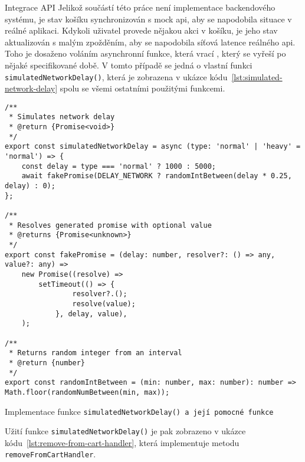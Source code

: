 \begin{subsection}{Integrace API}
    \label{subsec:implementace-kosik-api}
    Jelikož součástí této práce není implementace backendového systému, je stav košíku synchronizován s mock \ac{api}, aby se napodobila situace v reálné aplikaci.
    Kdykoli uživatel provede nějakou akci v košíku, je jeho stav aktualizován s malým zpožděním, aby se napodobila síťová latence reálného \ac{api}.
    Toho je dosaženo voláním asynchronní funkce, která vrací , který se vyřeší po nějaké specifikované době.
    V tomto případě se jedná o vlastní funkci \texttt{simulatedNetworkDelay()}, která je zobrazena v ukázce kódu~\ref{lst:simulated-network-delay} spolu se všemi ostatními použitými funkcemi.

    \begin{listing}[H]
        \begin{verbatim}
/**
 * Simulates network delay
 * @return {Promise<void>}
 */
export const simulatedNetworkDelay = async (type: 'normal' | 'heavy' = 'normal') => {
	const delay = type === 'normal' ? 1000 : 5000;
	await fakePromise(DELAY_NETWORK ? randomIntBetween(delay * 0.25, delay) : 0);
};

/**
 * Resolves generated promise with optional value
 * @returns {Promise<unknown>}
 */
export const fakePromise = (delay: number, resolver?: () => any, value?: any) =>
	new Promise((resolve) =>
		setTimeout(() => {
				resolver?.();
				resolve(value);
			}, delay, value),
	);

/**
 * Returns random integer from an interval
 * @return {number}
 */
export const randomIntBetween = (min: number, max: number): number => Math.floor(randomNumBetween(min, max));
        \end{verbatim}
        \caption{Implementace funkce \texttt{simulatedNetworkDelay() a její pomocné funkce}}
        \label{lst:simulated-network-delay}
    \end{listing}

    \pagebreak
    Užití funkce \texttt{simulatedNetworkDelay()} je pak zobrazeno v ukázce kódu~\ref{lst:remove-from-cart-handler}, která implementuje metodu \texttt{removeFromCartHandler}.


\end{subsection}
